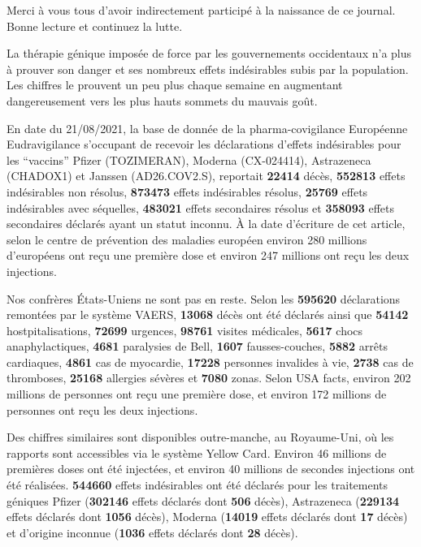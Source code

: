 \documentclass[a4paper]{article}
\begin{document}
\begin{multicols}{3}
Merci à vous tous d'avoir indirectement participé à la naissance de ce
journal. Bonne lecture et continuez la lutte.

  
La thérapie génique imposée de force par les gouvernements occidentaux
n'a plus à prouver son danger et ses nombreux effets indésirables
subis par la population. Les chiffres le prouvent un peu plus chaque
semaine en augmentant dangereusement vers les plus hauts sommets du
mauvais goût.

En date du 21/08/2021, la base de donnée de la pharma-covigilance
Européenne Eudravigilance\cite{AdrReports} s'occupant de recevoir les
déclarations d'effets indésirables pour les ``vaccins'' Pfizer
(TOZIMERAN), Moderna (CX-024414), Astrazeneca (CHADOX1) et Janssen
(AD26.COV2.S), reportait \textbf{22414} décès, \textbf{552813} effets
indésirables non résolus, \textbf{873473} effets indésirables résolus,
\textbf{25769} effets indésirables avec séquelles, \textbf{483021}
effets secondaires résolus et \textbf{358093} effets secondaires
déclarés ayant un statut inconnu. À la date d'écriture de cet article,
selon le centre de prévention des maladies
européen\cite{VaccineTracker} environ 280 millions d'européens ont
reçu une première dose et environ 247 millions ont reçu les deux
injections.

Nos confrères États-Uniens ne sont pas en reste. Selon les
\textbf{595620} déclarations remontées par le système
VAERS\cite{OpenVaers}, \textbf{13068} décès ont été déclarés ainsi que
\textbf{54142} hostpitalisations, \textbf{72699} urgences,
\textbf{98761} visites médicales, \textbf{5617} chocs anaphylactiques,
\textbf{4681} paralysies de Bell, \textbf{1607} fausses-couches,
\textbf{5882} arrêts cardiaques, \textbf{4861} cas de myocardie,
\textbf{17228} personnes invalides à vie, \textbf{2738} cas de
thromboses, \textbf{25168} allergies sévères et \textbf{7080}
zonas. Selon USA facts\cite{UsaFacts}, environ 202 millions de
personnes ont reçu une première dose, et environ 172 millions de
personnes ont reçu les deux injections.

Des chiffres similaires sont disponibles outre-manche, au Royaume-Uni,
où les rapports sont accessibles via le système Yellow
Card\cite{YellowCardReport}. Environ 46 millions de premières doses
ont été injectées, et environ 40 millions de secondes injections ont
été réalisées. \textbf{544660} effets indésirables ont été déclarés
pour les traitements géniques Pfizer (\textbf{302146} effets déclarés
dont \textbf{506} décès), Astrazeneca (\textbf{229134} effets déclarés
dont \textbf{1056} décès), Moderna (\textbf{14019} effets déclarés
dont \textbf{17} décès) et d'origine inconnue (\textbf{1036} effets
déclarés dont \textbf{28} décès).


\end{multicols}
\end{document}
